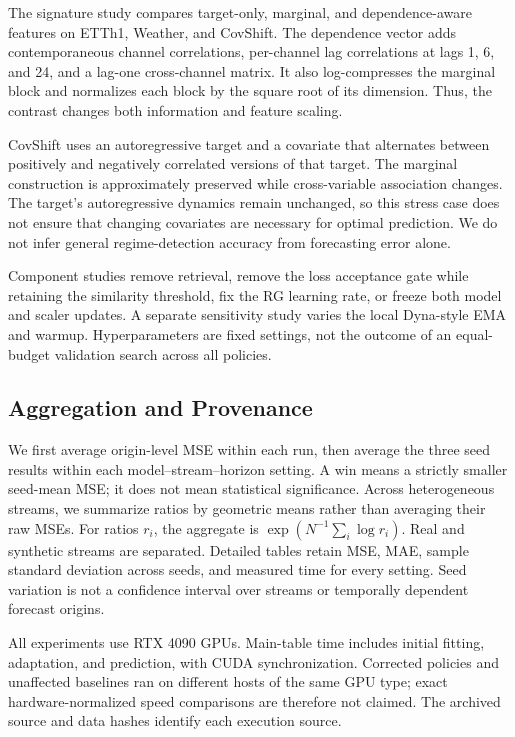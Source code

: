 \documentclass[conference]{IEEEtran}
\begin{document}
The signature study compares target-only, marginal, and dependence-aware features on ETTh1, Weather, and CovShift. The dependence vector adds contemporaneous channel correlations, per-channel lag correlations at lags 1, 6, and 24, and a lag-one cross-channel matrix. It also log-compresses the marginal block and normalizes each block by the square root of its dimension. Thus, the contrast changes both information and feature scaling.

CovShift uses an autoregressive target and a covariate that alternates between positively and negatively correlated versions of that target. The marginal construction is approximately preserved while cross-variable association changes. The target's autoregressive dynamics remain unchanged, so this stress case does not ensure that changing covariates are necessary for optimal prediction. We do not infer general regime-detection accuracy from forecasting error alone.

Component studies remove retrieval, remove the loss acceptance gate while retaining the similarity threshold, fix the RG learning rate, or freeze both model and scaler updates. A separate sensitivity study varies the local Dyna-style EMA and warmup. Hyperparameters are fixed settings, not the outcome of an equal-budget validation search across all policies.

\subsection{Aggregation and Provenance}
We first average origin-level MSE within each run, then average the three seed results within each model--stream--horizon setting. A win means a strictly smaller seed-mean MSE; it does not mean statistical significance. Across heterogeneous streams, we summarize ratios by geometric means rather than averaging their raw MSEs. For ratios $r_i$, the aggregate is $\exp(N^{-1}\sum_i\log r_i)$. Real and synthetic streams are separated. Detailed tables retain MSE, MAE, sample standard deviation across seeds, and measured time for every setting. Seed variation is not a confidence interval over streams or temporally dependent forecast origins.

All experiments use RTX 4090 GPUs. Main-table time includes initial fitting, adaptation, and prediction, with CUDA synchronization. Corrected policies and unaffected baselines ran on different hosts of the same GPU type; exact hardware-normalized speed comparisons are therefore not claimed. The archived source and data hashes identify each execution source.
\end{document}
